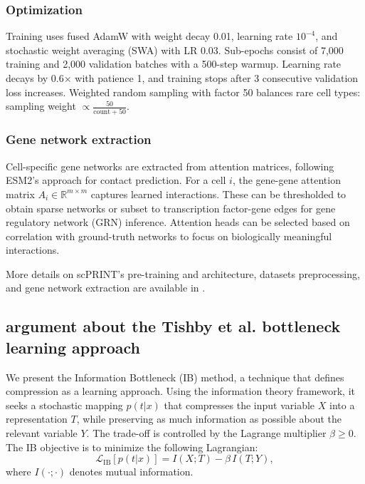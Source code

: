 \subsubsection{Optimization}
Training uses fused AdamW with weight decay 0.01, learning rate $10^{-4}$, and stochastic weight averaging (SWA) with LR 0.03. Sub-epochs consist of 7,000 training and 2,000 validation batches with a 500-step warmup. Learning rate decays by 0.6$\times$ with patience 1, and training stops after 3 consecutive validation loss increases. Weighted random sampling with factor 50 balances rare cell types: sampling weight $\propto \frac{50}{\text{count} + 50}$.

\subsubsection{Gene network extraction}
Cell-specific gene networks are extracted from attention matrices, following \gls{ESM}2's approach for contact prediction. For a cell $i$, the gene-gene attention matrix $A_i \in \mathbb{R}^{m \times m}$ captures learned interactions. These can be thresholded to obtain sparse networks or subset to transcription factor-gene edges for gene regulatory network (\gls{GRN}) inference. Attention heads can be selected based on correlation with ground-truth networks to focus on biologically meaningful interactions.

More details on \gls{scPRINT}'s pre-training and architecture, datasets preprocessing, and gene network extraction are available in \citet{scprint}.

\subsection{argument about the Tishby et al. bottleneck learning approach}
\label{sec:tishbi}
We present the Information Bottleneck (\gls{IB}) method, a technique that defines compression as a learning approach. Using the information theory framework, it seeks a stochastic mapping \( p(t|x) \) that compresses the input variable \( X \) into a representation \( T \), while preserving as much information as possible about the relevant variable \( Y \). The trade-off is controlled by the Lagrange multiplier \( \beta \geq 0 \). The \gls{IB} objective is to minimize the following Lagrangian:
\begin{equation}
\mathcal{L}_{\text{IB}}[p(t|x)] = I(X;T) - \beta\, I(T;Y),
\end{equation}
where \( I(\cdot;\cdot) \) denotes mutual information.

